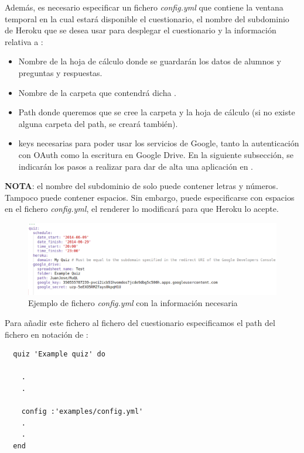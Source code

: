 Adem\'as, es necesario especificar un fichero \textit{config.yml} que contiene la ventana temporal en la cual estar\'a disponible
el cuestionario, el nombre del subdominio de Heroku que se desea usar para desplegar el cuestionario y la informaci\'on relativa a :
\begin{itemize}
  \item Nombre de la hoja de c\'alculo donde se guardar\'an los datos de alumnos y preguntas y respuestas.
  \item Nombre de la carpeta que contendr\'a dicha .
  \item Path donde queremos que se cree la carpeta y la hoja de c\'alculo (si no existe alguna carpeta del path, se crear\'a tambi\'en).
  \item {} keys necesarias para poder usar los servicios de Google, tanto la autenticaci\'on con OAuth como la escritura en Google Drive. 
  En la siguiente subsecci\'on,  se indicar\'an los pasos a realizar para dar de alta una aplicaci\'on en .
\end{itemize}

{\bfseries NOTA}: el nombre del subdominio de  solo puede contener letras y n\'umeros. Tampoco puede contener espacios. Sin embargo, puede especificarse
con espacios en el fichero \textit{config.yml}, el renderer lo modificar\'a para que Heroku lo acepte.
\bigskip

\begin{figure}[!th]
\begin{center}
\includegraphics[width=1.2\textwidth]{images/config_yml.eps}
\caption{Ejemplo de fichero \textit{config.yml} con la informaci\'on necesaria}
\label{fig:config_yml}
\end{center}
\end{figure}
\newpage

Para a\~{n}adir este fichero al fichero del cuestionario especificamos el path del fichero en notaci\'on de :
\begin{lstlisting}
  quiz 'Example quiz' do
    
    .
    .
    
    config :'examples/config.yml'
    .
    .
  end
\end{lstlisting}
\newpage

